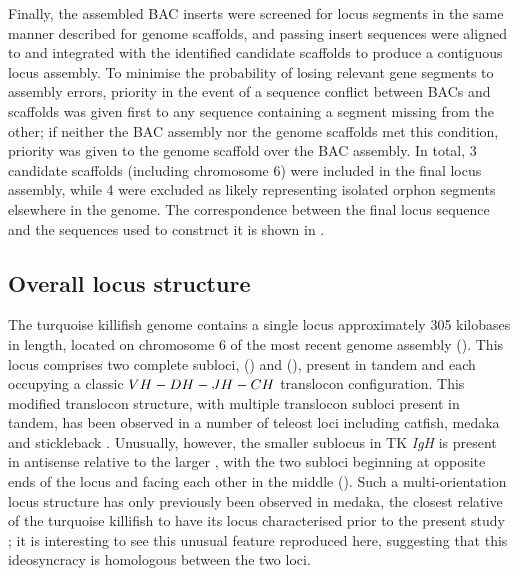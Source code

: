 Finally, the assembled BAC inserts were screened for \igh{} locus segments in the same manner described for genome scaffolds, and passing insert sequences were aligned to and integrated with the identified candidate scaffolds to produce a contiguous locus assembly. To minimise the probability of losing relevant gene segments to assembly errors, priority in the event of a sequence conflict between BACs and scaffolds was given first to any sequence containing a segment missing from the other; if neither the BAC assembly nor the genome scaffolds met this condition, priority was given to the genome scaffold over the BAC assembly. In total, 3 candidate scaffolds (including chromosome 6) were included in the final locus assembly, while 4 were excluded as likely representing isolated \igh{} orphon segments elsewhere in the genome. The correspondence between the final locus sequence and the sequences used to construct it is shown in . %

\subsection{Overall locus structure}
\label{sec:nfu-locus-structure}
	
The turquoise killifish genome contains a single \igh{} locus approximately 305 kilobases in length, located on chromosome 6 of the most recent \Nfu genome assembly (). This locus comprises two complete subloci,  () and  (), present in tandem and each occupying a classic ${VH-DH-JH-CH}$ translocon configuration. This modified translocon structure, with multiple translocon subloci present in tandem, has been observed in a number of teleost \igh{} loci including catfish, medaka and stickleback \parencite{fillatreau2013astonishing}. Unusually, however, the smaller  sublocus in TK \textit{IgH} is present in antisense relative to the larger , with the two subloci beginning at opposite ends of the locus and facing each other in the middle (). Such a multi-orientation locus structure has only previously been observed in medaka, the closest relative of the turquoise killifish to have its locus characterised prior to the present study \parencite{magadan2011medaka}; it is interesting to see this unusual feature reproduced here, suggesting that this ideosyncracy is homologous between the two loci.
	
